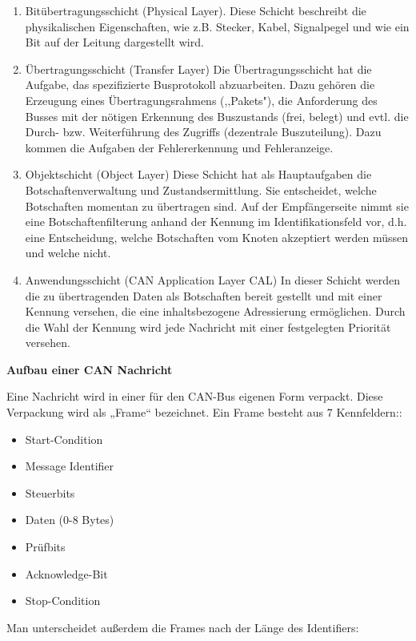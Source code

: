 \begin{enumerate}

	\item Bitübertragungsschicht (Physical Layer).
	Diese Schicht beschreibt die physikalischen
	Eigenschaften, wie z.B. Stecker, Kabel, Signalpegel und wie ein Bit auf der Leitung
	dargestellt wird.
	\item Übertragungsschicht (Transfer Layer)
	Die Übertragungsschicht hat die Aufgabe, das spezifizierte Busprotokoll abzuarbeiten.
	Dazu gehören die Erzeugung eines Übertragungsrahmens (,‚Pakets"), die Anforderung
	des Busses mit der nötigen Erkennung des Buszustands (frei, belegt) und evtl. die
	Durch- bzw. Weiterführung des Zugriffs (dezentrale Buszuteilung). Dazu kommen die
	Aufgaben der Fehlererkennung und Fehleranzeige.
	\item Objektschicht (Object Layer)
	Diese Schicht hat als Hauptaufgaben die Botschaftenverwaltung und
	Zustandsermittlung. Sie entscheidet, welche Botschaften momentan zu übertragen
	sind. Auf der Empfängerseite nimmt sie eine Botschaftenfilterung anhand der Kennung
	im Identifikationsfeld vor, d.h. eine Entscheidung, welche Botschaften vom Knoten
	akzeptiert werden müssen und welche nicht.
	\item Anwendungsschicht (CAN Application Layer CAL)
	In dieser Schicht werden die zu übertragenden Daten als Botschaften bereit gestellt
	und mit einer Kennung versehen, die eine inhaltsbezogene Adressierung ermöglichen.
	Durch die Wahl der Kennung wird jede Nachricht mit einer festgelegten Priorität
	versehen.

\end{enumerate}

\textbf{Aufbau einer CAN Nachricht}

Eine Nachricht wird in einer für den CAN-Bus eigenen Form verpackt. Diese Verpackung
wird als „Frame“ bezeichnet.
Ein Frame besteht aus 7 Kennfeldern::

\begin{itemize}
	\item Start-Condition
	\item Message Identifier
	\item Steuerbits
	\item Daten (0-8 Bytes)
	\item Prüfbits
	\item Acknowledge-Bit
	\item Stop-Condition
\end{itemize}

Man unterscheidet außerdem die Frames nach der Länge des Identifiers:

